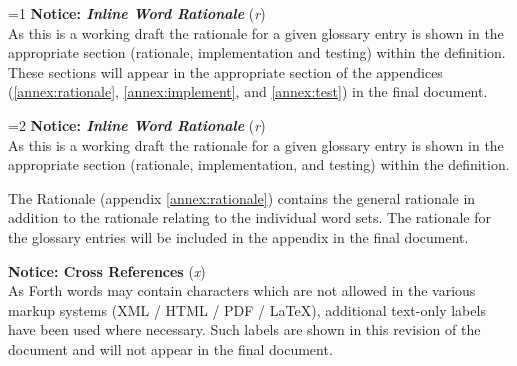 \begin{titlepage}
%
%

\ifnum\value{part}=1
	\ifinline
\textbf{Notice: \emph{Inline Word Rationale}} (\textit{r}) \\
As this is a working draft the rationale for a given glossary
entry is shown in the appropriate section (rationale,
implementation and testing) within the definition.
These sections will appear in the appropriate section of
the appendices (\ref{annex:rationale}, \ref{annex:implement},
and \ref{annex:test}) in the final document.
	\fi
\fi


%
%

\ifnum\value{part}=2
	\ifinline
\textbf{Notice: \emph{Inline Word Rationale}} (\textit{r}) \\
As this is a working draft the rationale for a given glossary
entry is shown in the appropriate section (rationale,
implementation, and testing) within the definition.

The Rationale (appendix \ref{annex:rationale}) contains the
general rationale in addition to the rationale relating to
the individual word sets.
The rationale for the glossary entries will be included in
the appendix in the final document.
	\fi
\fi


\ifshowref
\textbf{Notice: Cross References} (\textit{x}) \\
As Forth words may contain characters which are not allowed in the
various markup systems (XML / HTML / PDF / \LaTeX), additional
text-only labels have been used where necessary. Such labels are
shown in this revision of the document and will not appear in the
final document.
\fi
\end{titlepage}
